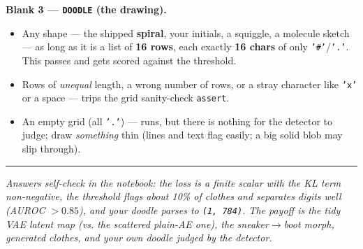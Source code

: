 \documentclass[11pt]{article}
\newcommand{\opt}[1]{\texttt{#1}}
\begin{document}
\textbf{Blank 3 --- \texttt{DOODLE} (the drawing).}
\begin{itemize}
  \item[(a)] Any shape --- the shipped \textbf{spiral}, your initials, a squiggle, a molecule
    sketch --- as long as it is a list of \textbf{16 rows}, each exactly \textbf{16 chars} of only
    \opt{'\#'}/\opt{'.'}. This passes and gets scored against the threshold.
  \item[(b)] Rows of \emph{unequal} length, a wrong number of rows, or a stray character like
    \opt{'x'} or a space --- trips the grid sanity-check \opt{assert}.
  \item[(c)] An empty grid (all \opt{'.'}) --- runs, but there is nothing for the detector to judge;
    draw \emph{something} thin (lines and text flag easily; a big solid blob may slip through).
\end{itemize}

\vspace{4pt}\hrule\vspace{3pt}
{\small\itshape Answers self-check in the notebook: the loss is a finite scalar with the KL term
non-negative, the threshold flags about 10\% of clothes and
separates digits well (AUROC $>0.85$), and your doodle parses to \opt{(1, 784)}. The payoff is the
tidy VAE latent map (vs. the scattered plain-AE one), the sneaker$\to$boot morph, generated clothes,
and your own doodle judged by the detector.}
\end{document}
